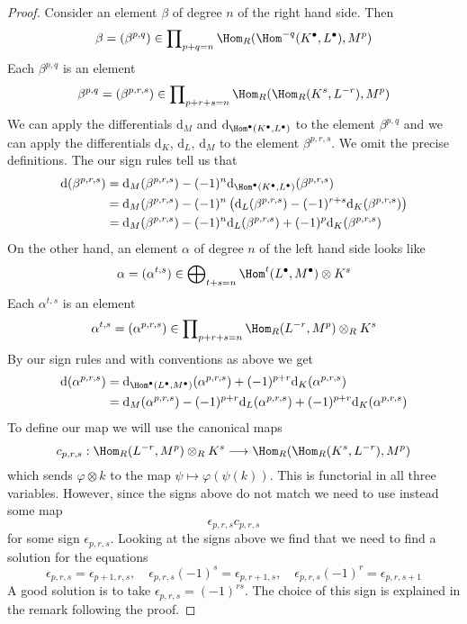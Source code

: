 \begin{proof}
Consider an element $\beta$ of degree $n$ of the right hand side.
Then
$$
\beta = (\beta^{p, q}) \in
\prod\nolimits_{p + q = n} \Hom_R(\Hom^{-q}(K^\bullet, L^\bullet), M^p)
$$
Each $\beta^{p, q}$ is an element
$$
\beta^{p, q} = (\beta^{p, r, s}) \in
\prod\nolimits_{p + r + s = n} \Hom_R(\Hom_R(K^s, L^{-r}), M^p)
$$
We can apply the differentials $\text{d}_M$ and
$\text{d}_{\Hom^\bullet(K^\bullet, L^\bullet)}$
to the element $\beta^{p, q}$ and we can apply the
differentials $\text{d}_K$, $\text{d}_L$, $\text{d}_M$
to the element $\beta^{p, r, s}$. We omit the precise definitions.
The our sign rules tell us that
\begin{align*}
\text{d}(\beta^{p, r, s})
& =
\text{d}_M(\beta^{p, r, s})
- (-1)^n \text{d}_{\Hom^\bullet(K^\bullet, L^\bullet)}(\beta^{p, r, s}) \\
& =
\text{d}_M(\beta^{p, r, s})
- (-1)^n \left(
\text{d}_L(\beta^{p, r, s}) - (-1)^{r + s} \text{d}_K(\beta^{p, r, s})
\right) \\
& =
\text{d}_M(\beta^{p, r, s})
- (-1)^n \text{d}_L(\beta^{p, r, s})
+ (-1)^p \text{d}_K(\beta^{p, r, s})
\end{align*}
On the other hand, an element $\alpha$
of degree $n$ of the left hand side looks like
$$
\alpha = (\alpha^{t, s}) \in
\bigoplus\nolimits_{t + s = n} \Hom^t(L^\bullet, M^\bullet) \otimes K^s
$$
Each $\alpha^{t, s}$ is an element
$$
\alpha^{t, s} = (\alpha^{p, r, s}) \in
\prod\nolimits_{p + r + s = n} \Hom_R(L^{-r}, M^p) \otimes_R K^s
$$
By our sign rules and with conventions as above we get
\begin{align*}
\text{d}(\alpha^{p, r, s})
& =
\text{d}_{\Hom^\bullet(L^\bullet, M^\bullet)}(\alpha^{p, r, s})
+ (-1)^{p + r} \text{d}_K(\alpha^{p, r, s}) \\
& =
\text{d}_M(\alpha^{p, r, s})
- (-1)^{p + r} \text{d}_L(\alpha^{p, r, s})  +
(-1)^{p + r} \text{d}_K(\alpha^{p, r, s})
\end{align*}
To define our map we will use the canonical maps
$$
c_{p, r, s} : 
\Hom_R(L^{-r}, M^p) \otimes_R K^s
\longrightarrow
\Hom_R(\Hom_R(K^s, L^{-r}), M^p)
$$
which sends $\varphi \otimes k$ to the map $\psi \mapsto \varphi(\psi(k))$.
This is functorial in all three variables.
However, since the signs above do not match we need to use instead
some map
$$
\epsilon_{p, r, s} c_{p, r, s}
$$
for some sign $\epsilon_{p, r, s}$. Looking at the signs above we
find that we need to find a solution for the equations
$$
\epsilon_{p, r, s} = \epsilon_{p + 1, r, s}, \quad
\epsilon_{p, r, s} (-1)^s = \epsilon_{p, r + 1, s}, \quad
\epsilon_{p, r, s} (-1)^r = \epsilon_{p, r, s + 1}
$$
A good solution is to take $\epsilon_{p, r, s} = (-1)^{rs}$.
The choice of this sign is explained in the remark following
the proof.
\end{proof}

